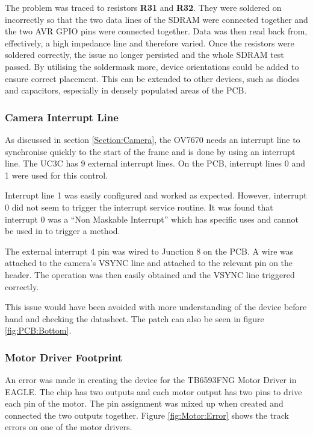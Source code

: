 The problem was traced to resistors \textbf{R31} and \textbf{R32}. They were soldered on incorrectly so that the two data lines of the SDRAM were connected together and the two AVR GPIO pins were connected together. Data was then read back from, effectively, a high impedance line and therefore varied. Once the resistors were soldered correctly, the issue no longer persisted and the whole SDRAM test passed. By utilising the soldermask more, device orientations could be added to ensure correct placement. This can be extended to other devices, such as diodes and capacitors, especially in densely populated areas of the PCB. 

\subsubsection{Camera Interrupt Line}

As discussed in section \ref{Section:Camera}, the OV7670 needs an interrupt line to synchronise quickly to the start of the frame and is done by using an interrupt line. The UC3C has 9 external interrupt lines. On the PCB, interrupt lines 0 and 1 were used for this control.

Interrupt line 1 was easily configured and worked as expected. However, interrupt 0 did not seem to trigger the interrupt service routine. It was found that interrupt 0 was a ``Non Maskable Interrupt'' which has specific uses and cannot be used in to trigger a method. 

The external interrupt 4 pin was wired to Junction 8 on the PCB. A wire was attached to the camera's VSYNC line and attached to the relevant pin on the header. The operation was then easily obtained and the VSYNC line triggered correctly.

This issue would have been avoided with more understanding of the device before hand and checking the datasheet. The patch can also be seen in figure \ref{fig:PCB:Bottom}.


\subsubsection{Motor Driver Footprint}

An error was made in creating the device for the TB6593FNG Motor Driver in EAGLE. The chip has two outputs and each motor output has two pins to drive each pin of the motor. The pin assignment was mixed up when created and connected the two outputs together. Figure \ref{fig:Motor:Error} shows the track errors on one of the motor drivers. 

